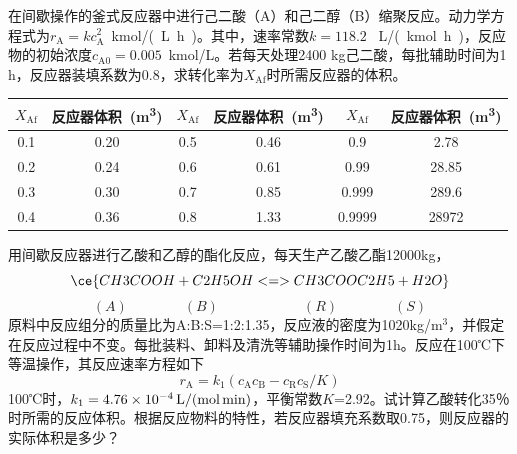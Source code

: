 \documentclass[dvipsnames, svgnames, x11names]{beamer}
\begin{document}
\begin{frame}[t]
    \frametitle{}
    \begin{question}
        在间歇操作的釜式反应器中进行己二酸（A）和己二醇（B）缩聚反应。动力学方程式为$r_\mathrm{A} = kc_\mathrm{A}^2$\ \si{kmol/(L.h)}。其中，速率常数$k = 118.2$ \ \si{L/(kmol.h)}，反应物的初始浓度$c_\mathrm{A0} = 0.005$\ \si{kmol/L}。若每天处理2400 kg己二酸，每批辅助时间为1 h，反应器装填系数为0.8，求转化率为$X_\mathrm{Af}$时所需反应器的体积。
        \begin{table}
            \centering
            \begin{tabular}{cc||cc||cc}
                \bottomrule
                $X_\mathrm{Af}$ & 反应器体积\ (\si{m^3}) & $X_\mathrm{Af}$ & 反应器体积\ (\si{m^3}) & $X_\mathrm{Af}$ & 反应器体积\ (\si{m^3}) \\ \hline
                0.1 & 0.20 & 0.5 & 0.46 & 0.9 & 2.78 \\ 
                0.2 & 0.24 & 0.6 & 0.61 & 0.99 & 28.85 \\ 
                0.3 & 0.30 & 0.7 & 0.85 & 0.999 & 289.6 \\ 
                0.4 & 0.36 & 0.8 & 1.33 & 0.9999 & 28972 \\ \toprule
            \end{tabular}
        \end{table}
    \end{question}
\end{frame}


\begin{frame}[t]{}
    \begin{example}
        用间歇反应器进行乙酸和乙醇的酯化反应，每天生产乙酸乙酯12000kg，
            $$\ce{CH3COOH + C2H5OH <=> CH3COOC2H5 + H2O}$$
            $$(A)\qquad\qquad(B)\qquad\qquad\qquad(R)\qquad\qquad(S)$$
        原料中反应组分的质量比为A:B:S=1:2:1.35，反应液的密度为1020kg/m$^3$，并假定在反应过程中不变。每批装料、卸料及清洗等辅助操作时间为1h。反应在100℃下等温操作，其反应速率方程如下
        \vspace{-7pt}
        $$r_{\mathrm{A}}=k_{1}(c_{\mathrm{A}} c_{\mathrm{B}}-c_{\mathrm{R}} c_{\mathrm{S}} / K)$$
        100℃时，$k_1=\SI{4.76e{-4}}{L/(mol.min)}$，平衡常数$K$=2.92。试计算乙酸转化35％时所需的反应体积。根据反应物料的特性，若反应器填充系数取0.75，则反应器的实际体积是多少？
    \end{example}
\end{frame}
\end{document}
